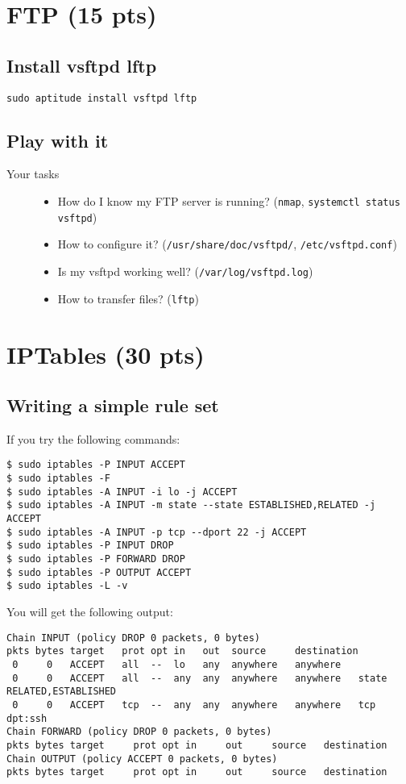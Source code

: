 \documentclass{article} [NO-DEFAULT-PACKAGES] \usepackage{wx672hyperref}
\begin{document}
\section{FTP (15 pts)}
\label{sec:orgc0c9c55}
\subsection{Install vsftpd lftp}
\label{sec:orgf3fea82}
\begin{verbatim}
sudo aptitude install vsftpd lftp
\end{verbatim}
\subsection{Play with it}
\label{sec:orgb26696f}
\begin{description}
\item[{Your tasks}] \begin{itemize}
\item How do I know my FTP server is running? (\texttt{nmap}, \texttt{systemctl status vsftpd})
\item How to configure it? (\texttt{/usr/share/doc/vsftpd/}, \texttt{/etc/vsftpd.conf})
\item Is my vsftpd working well? (\texttt{/var/log/vsftpd.log})
\item How to transfer files? (\texttt{lftp})
\end{itemize}
\end{description}

\section{IPTables (30 pts)}
\label{sec:org123474a}
\subsection{Writing a simple rule set}
\label{sec:orgc95cebd}
If you try the following commands:

\begin{verbatim}
$ sudo iptables -P INPUT ACCEPT
$ sudo iptables -F
$ sudo iptables -A INPUT -i lo -j ACCEPT
$ sudo iptables -A INPUT -m state --state ESTABLISHED,RELATED -j ACCEPT
$ sudo iptables -A INPUT -p tcp --dport 22 -j ACCEPT
$ sudo iptables -P INPUT DROP
$ sudo iptables -P FORWARD DROP
$ sudo iptables -P OUTPUT ACCEPT
$ sudo iptables -L -v
\end{verbatim}

You will get the following output:
\begin{verbatim}
Chain INPUT (policy DROP 0 packets, 0 bytes)
pkts bytes target   prot opt in   out  source     destination
 0     0   ACCEPT   all  --  lo   any  anywhere   anywhere
 0     0   ACCEPT   all  --  any  any  anywhere   anywhere   state RELATED,ESTABLISHED
 0     0   ACCEPT   tcp  --  any  any  anywhere   anywhere   tcp dpt:ssh
Chain FORWARD (policy DROP 0 packets, 0 bytes)
pkts bytes target     prot opt in     out     source   destination
Chain OUTPUT (policy ACCEPT 0 packets, 0 bytes)
pkts bytes target     prot opt in     out     source   destination
\end{verbatim}
\end{document}
